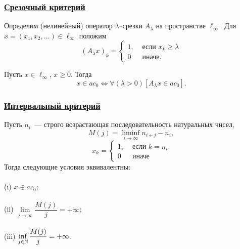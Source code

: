 \begin{frame}\frametitle{\underline{Срезочный критерий}}
	Определим (нелинейный) оператор $\lambda$--срезки $A_\lambda$ на пространстве $\ell_\infty$.
	Для $x = (x_1, x_2, ...) \in \ell_\infty$ положим
	\begin{equation}
		(A_\lambda x)_k = \begin{cases}
			1, & \mbox{~если~} x_k \geq \lambda
			\\
			0  & \mbox{~иначе.~}
		\end{cases}
	\end{equation}

	\vfill

	\begin{ttheorem}
		Пусть $x\in\ell_\infty$, $x\geq 0$.
		Тогда
		\begin{equation}
			x\in ac_0 \Leftrightarrow
			\forall(\lambda>0)[A_\lambda x \in ac_0]
			.
		\end{equation}
	\end{ttheorem}
\end{frame}




\begin{frame}\frametitle{\underline{Интервальный критерий}}
		\label{thm:M_j_ac0_inf_lim}
		Пусть $n_i$~--- строго возрастающая последовательность натуральных чисел,
		\begin{equation}
			\label{eq:definition_M_j}
			M(j) = \liminf_{i\to\infty} n_{i+j} - n_i,
		\end{equation}
		\begin{equation}
			x_k = \left\{\begin{array}{ll}
				1, & \mbox{~если~} k = n_i
				\\
				0  & \mbox{~иначе~}
			\end{array}\right.
		\end{equation}
		Тогда следующие условия эквивалентны:
		\\~\\
		(i)   $x \in ac_0$;
		\\~\\
		(ii)  $\lim\limits_{j \to \infty} \dfrac{M(j)}{j} = +\infty$;
		\\~\\
		(iii) $\inf\limits_{j \in \mathbb{N}}     \dfrac{M(j)}{j} = +\infty$.
\end{frame}



